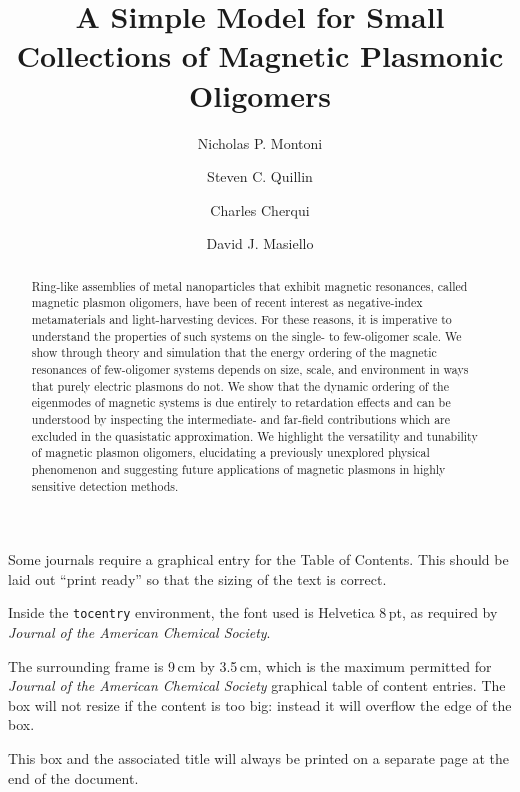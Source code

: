 \documentclass[journal=ancac3,manuscript=article]{achemso}
\author{Nicholas P. Montoni}
\author{Steven C. Quillin}
\author{Charles Cherqui}
\author{David J. Masiello}
\affiliation[Department of Chemistry, University of Washington]
{Department of Chemistry, University of Washington, Seattle, WA 98195}
\title[]
    {A Simple Model for Small Collections of Magnetic Plasmonic Oligomers}
\begin{document}
\begin{tocentry}

Some journals require a graphical entry for the Table of Contents.
This should be laid out ``print ready'' so that the sizing of the
text is correct.

Inside the \texttt{tocentry} environment, the font used is Helvetica
8\,pt, as required by \emph{Journal of the American Chemical
Society}.

The surrounding frame is 9\,cm by 3.5\,cm, which is the maximum
permitted for  \emph{Journal of the American Chemical Society}
graphical table of content entries. The box will not resize if the
content is too big: instead it will overflow the edge of the box.

This box and the associated title will always be printed on a
separate page at the end of the document.

\end{tocentry}

\begin{abstract}
Ring-like assemblies of metal nanoparticles that exhibit magnetic resonances, called magnetic plasmon oligomers, have been of recent interest as negative-index metamaterials and light-harvesting devices. For these reasons, it is imperative to understand the properties of such systems on the single- to few-oligomer scale. We show through theory and simulation that the energy ordering of the magnetic resonances of few-oligomer systems depends on size, scale, and environment in ways that purely electric plasmons do not. We show that the dynamic ordering of the eigenmodes of magnetic systems is due entirely to retardation effects and can be understood by inspecting the intermediate- and far-field contributions which are excluded in the quasistatic approximation. We highlight the versatility and tunability of magnetic plasmon oligomers, elucidating a previously unexplored physical phenomenon and suggesting future applications of magnetic plasmons in highly sensitive detection methods. 
\end{abstract}
\end{document}
